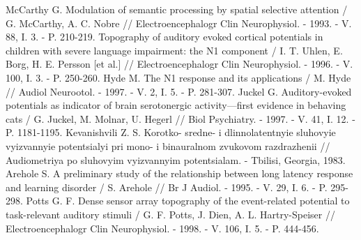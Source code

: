 \documentclass[twocolumn]{article}
\begin{document}
\begin{thebibliography}{35}
McCarthy G. Modulation of semantic processing by spatial selective attention / G. McCarthy, A. C. Nobre  // Electroencephalogr Clin Neurophysiol. - 1993. - V. 88, I. 3. - P. 210-219.
Topography of auditory evoked cortical potentials in children with severe language impairment: the N1 component / I. T. Uhlen, E. Borg, H. E. Persson [et al.] // Electroencephalogr Clin Neurophysiol. - 1996. - V. 100, I. 3. - P. 250-260.
Hyde M. The N1 response and its applications / M. Hyde // Audiol Neurootol. - 1997. - V. 2, I. 5. - P. 281-307.
Juckel G. Auditory-evoked potentials as indicator of brain serotonergic activity—first evidence in behaving cats / G. Juckel, M. Molnar, U. Hegerl // Biol Psychiatry. - 1997. - V. 41, I. 12. - P. 1181-1195.
Kevanishvili Z. S. Korotko- sredne- i dlinnolatentnyie sluhovyie vyizvannyie potentsialyi pri mono- i binauralnom zvukovom razdrazhenii // Audiometriya po sluhovyim vyizvannyim potentsialam. - Tbilisi, Georgia, 1983.
Arehole S. A preliminary study of the relationship between long latency response and learning disorder / S. Arehole // Br J Audiol. - 1995. - V. 29, I. 6. - P. 295-298.
Potts G. F. Dense sensor array topography of the event-related potential to task-relevant auditory stimuli / G. F. Potts, J. Dien, A. L. Hartry-Speiser // Electroencephalogr Clin Neurophysiol. - 1998. - V. 106, I. 5. - P. 444-456.
\end{thebibliography}
\end{document}
